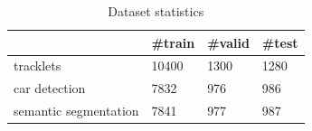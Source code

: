 \documentclass[10pt,twocolumn,letterpaper]{article}
\newcommand{\ra}[1]{\renewcommand{\arraystretch}{#1}}
\begin{document}
\begin{table}\centering
\ra{1.}

\begin{tabu}{@{}llll@{}}\toprule
[-1pt] 
                & \#train & \#valid & \#test\\
 \hline

 tracklets      &  10400    &  1300    & 1280 \\
 \hline
 car detection  &   7832     & 976     & 986 \\
 \hline
 semantic segmentation  &  7841  & 977  & 987 \\
 \hline
 \end{tabu}
\caption{Dataset statistics}
\label{tab:dataset_statistics}
\end{table}
\end{document}
